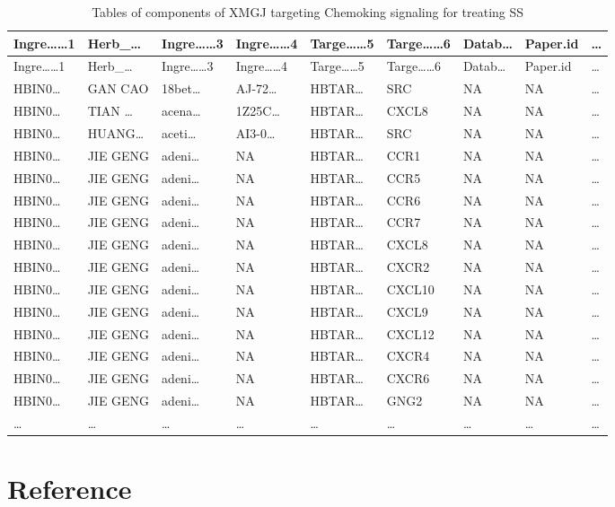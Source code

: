 \documentclass[
]{article}
\begin{document}
\begin{longtable}[]{@{}lllllllll@{}}
\caption{\label{tab:tables-of-components-of-XMGJ-targeting-Chemoking-signaling-for-treating-SS}Tables of components of XMGJ targeting Chemoking signaling for treating SS}\tabularnewline
\toprule
Ingre\ldots\ldots1 & Herb\_\ldots{} & Ingre\ldots\ldots3 & Ingre\ldots\ldots4 & Targe\ldots\ldots5 & Targe\ldots\ldots6 & Datab\ldots{} & Paper.id & \ldots{}\tabularnewline
\midrule
\endfirsthead
\toprule
Ingre\ldots\ldots1 & Herb\_\ldots{} & Ingre\ldots\ldots3 & Ingre\ldots\ldots4 & Targe\ldots\ldots5 & Targe\ldots\ldots6 & Datab\ldots{} & Paper.id & \ldots{}\tabularnewline
\midrule
\endhead
HBIN0\ldots{} & GAN CAO & 18bet\ldots{} & AJ-72\ldots{} & HBTAR\ldots{} & SRC & NA & NA & \ldots{}\tabularnewline
HBIN0\ldots{} & TIAN \ldots{} & acena\ldots{} & 1Z25C\ldots{} & HBTAR\ldots{} & CXCL8 & NA & NA & \ldots{}\tabularnewline
HBIN0\ldots{} & HUANG\ldots{} & aceti\ldots{} & AI3-0\ldots{} & HBTAR\ldots{} & SRC & NA & NA & \ldots{}\tabularnewline
HBIN0\ldots{} & JIE GENG & adeni\ldots{} & NA & HBTAR\ldots{} & CCR1 & NA & NA & \ldots{}\tabularnewline
HBIN0\ldots{} & JIE GENG & adeni\ldots{} & NA & HBTAR\ldots{} & CCR5 & NA & NA & \ldots{}\tabularnewline
HBIN0\ldots{} & JIE GENG & adeni\ldots{} & NA & HBTAR\ldots{} & CCR6 & NA & NA & \ldots{}\tabularnewline
HBIN0\ldots{} & JIE GENG & adeni\ldots{} & NA & HBTAR\ldots{} & CCR7 & NA & NA & \ldots{}\tabularnewline
HBIN0\ldots{} & JIE GENG & adeni\ldots{} & NA & HBTAR\ldots{} & CXCL8 & NA & NA & \ldots{}\tabularnewline
HBIN0\ldots{} & JIE GENG & adeni\ldots{} & NA & HBTAR\ldots{} & CXCR2 & NA & NA & \ldots{}\tabularnewline
HBIN0\ldots{} & JIE GENG & adeni\ldots{} & NA & HBTAR\ldots{} & CXCL10 & NA & NA & \ldots{}\tabularnewline
HBIN0\ldots{} & JIE GENG & adeni\ldots{} & NA & HBTAR\ldots{} & CXCL9 & NA & NA & \ldots{}\tabularnewline
HBIN0\ldots{} & JIE GENG & adeni\ldots{} & NA & HBTAR\ldots{} & CXCL12 & NA & NA & \ldots{}\tabularnewline
HBIN0\ldots{} & JIE GENG & adeni\ldots{} & NA & HBTAR\ldots{} & CXCR4 & NA & NA & \ldots{}\tabularnewline
HBIN0\ldots{} & JIE GENG & adeni\ldots{} & NA & HBTAR\ldots{} & CXCR6 & NA & NA & \ldots{}\tabularnewline
HBIN0\ldots{} & JIE GENG & adeni\ldots{} & NA & HBTAR\ldots{} & GNG2 & NA & NA & \ldots{}\tabularnewline
\ldots{} & \ldots{} & \ldots{} & \ldots{} & \ldots{} & \ldots{} & \ldots{} & \ldots{} & \ldots{}\tabularnewline
\bottomrule
\end{longtable}

\hypertarget{bibliography}{%
\section*{Reference}\label{bibliography}}
\end{document}
